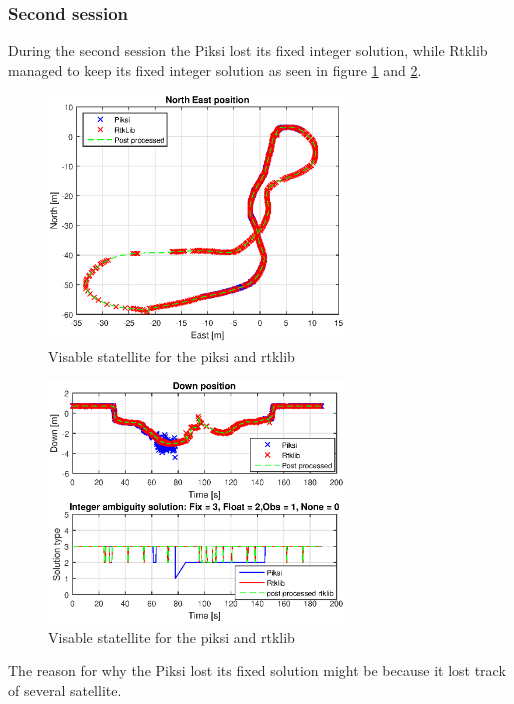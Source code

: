 \subsubsection{Second session}
During the second session the Piksi lost its fixed integer solution, while Rtklib managed to keep its fixed integer solution as seen in figure \ref{figure:xyWalk2} and \ref{figure:downWalk2}. 
\begin{figure}[H]
	\centering
		\includegraphics[width=0.7\textwidth]{figs/plots/xywalk2.eps}
		\caption{Visable statellite for the piksi and rtklib}
		\label{figure:xyWalk2}
\end{figure}
\begin{figure}[H]
	\centering
		\includegraphics[width=0.7\textwidth]{figs/plots/downWalk2.eps}
		\caption{Visable statellite for the piksi and rtklib}
		\label{figure:downWalk2}
\end{figure}
The reason for why the Piksi lost its fixed solution might be because it lost track of several satellite. 
